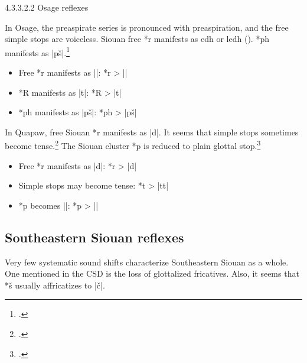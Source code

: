 \documentclass[output=paper]{LSP/langsci}
\begin{document}
4.3.3.2.2  Osage reflexes
\vspace{1em}

In Osage, the preaspirate series is pronounced with preaspiration, and the free simple stops are voiceless.  Siouan free *r manifests as edh or ledh ().  *ph manifests as |pš|.\footnote{ \citealt[64]{Rankinetal2006PDF}.} 

\begin{itemize}
\item Free *r manifests as ||: \hspace{1em} *r	>	||
\item *R manifests as |t|: \hspace{3em} *R	>	|t|
\item *ph manifests as |pš|: \hspace{2em} *ph	>	|pš|
\end{itemize}


In Quapaw, free Siouan *r manifests as |d|.  It seems that simple stops sometimes become tense.\footnote{\citealt[833]{Rankinetal2006PDF}.} The Siouan cluster *p\textsuperscript{} is reduced to plain glottal stop.\footnote{\citealt[831]{Rankinetal2006PDF}.} 

\begin{itemize}
\item Free *r manifests as |d|: \hspace{5em} *r	>	|d|
\item Simple stops may become tense:	\hspace{1em} *t	>	|tt|
\item *p\textsuperscript{} becomes |\textsuperscript{}|: \hspace{8em} *p\textsuperscript{}	>	|\textsuperscript{}|
\end{itemize}

\subsection{Southeastern Siouan reflexes}

Very few systematic sound shifts characterize Southeastern Siouan as a whole.  One mentioned in the CSD is the loss of glottalized fricatives.  Also, it seems that *š usually affricatizes to |\v{c}|.
\end{document}

